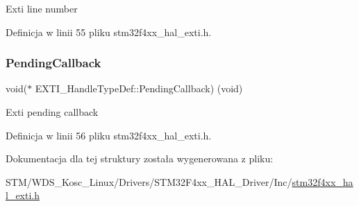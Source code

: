 Exti line number 

Definicja w linii 55 pliku stm32f4xx\+\_\+hal\+\_\+exti.\+h.

\mbox{\label{struct_e_x_t_i___handle_type_def_a854aa31dcf03aab7089851afae6da8d3}} 
\subsubsection{\texorpdfstring{Pending\+Callback}{PendingCallback}}
{\footnotesize\ttfamily void($\ast$  E\+X\+T\+I\+\_\+\+Handle\+Type\+Def\+::\+Pending\+Callback) (void)}

Exti pending callback 

Definicja w linii 56 pliku stm32f4xx\+\_\+hal\+\_\+exti.\+h.



Dokumentacja dla tej struktury została wygenerowana z pliku\+:\begin{DoxyCompactItemize}
\item 
S\+T\+M/\+W\+D\+S\+\_\+\+Kosc\+\_\+\+Linux/\+Drivers/\+S\+T\+M32\+F4xx\+\_\+\+H\+A\+L\+\_\+\+Driver/\+Inc/\hyperlink{stm32f4xx__hal__exti_8h}{stm32f4xx\+\_\+hal\+\_\+exti.\+h}\end{DoxyCompactItemize}
